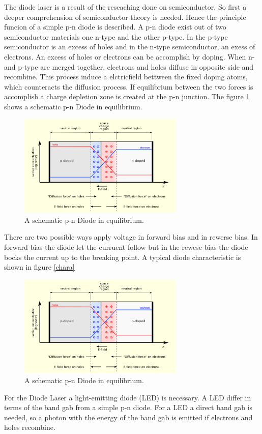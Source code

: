 The diode laser is a result of the reseaching done on semiconductor.
So first a deeper comprehension of semiconductor theory is needed.
Hence the principle funcion of a simple p-n diode is described.
A p-n diode exist out of two semiconductor materials one
n-type and the other p-type.
In the p-type semiconductor is an excess of holes
and in the n-type semiconductor, an exess of electrons.
An excess of holes or electrons can be accomplish by doping.
When n- and p-type are merged together,
electrons and holes diffuse in opposite side and recombine.
This process induce a elctricfield bettween the fixed doping atoms, which
counteracts the diffusion process.
If equilibrium between the two forces is accomplish
a charge depletion zone is created
at the p-n junction.
The figure \ref{fig:equi} shows
a schematic p-n Diode in equilibrium.

\begin{figure}
\centering
\includegraphics[width=0.7\textwidth]{equilibrium.png}
\caption{A schematic p-n Diode in equilibrium.
\cite{wiki_diode}}
\label{fig:equi}
\end{figure}

There are two possible ways apply voltage
in forward bias and
in rewerse bias.
In forward bias the diode let the curruent follow
but in the rewese bias the diode bocks the current up to the breaking point.
A typical diode characteristic is shown in figure \ref{chara}
\begin{figure}
\centering
\includegraphics[width=0.7\textwidth]{equilibrium.png}
\caption{A schematic p-n Diode in equilibrium.
\cite{sparkfun}} %
\label{fig:chara}
\end{figure}
For the Diode Laser a light-emitting diode (LED)
is necessary. A LED differ in terms of
the band gab
from a simple p-n diode.
For a LED a direct band gab is needed, so a photon
with the energy of the band gab is
emitted if electrons and holes recombine.

